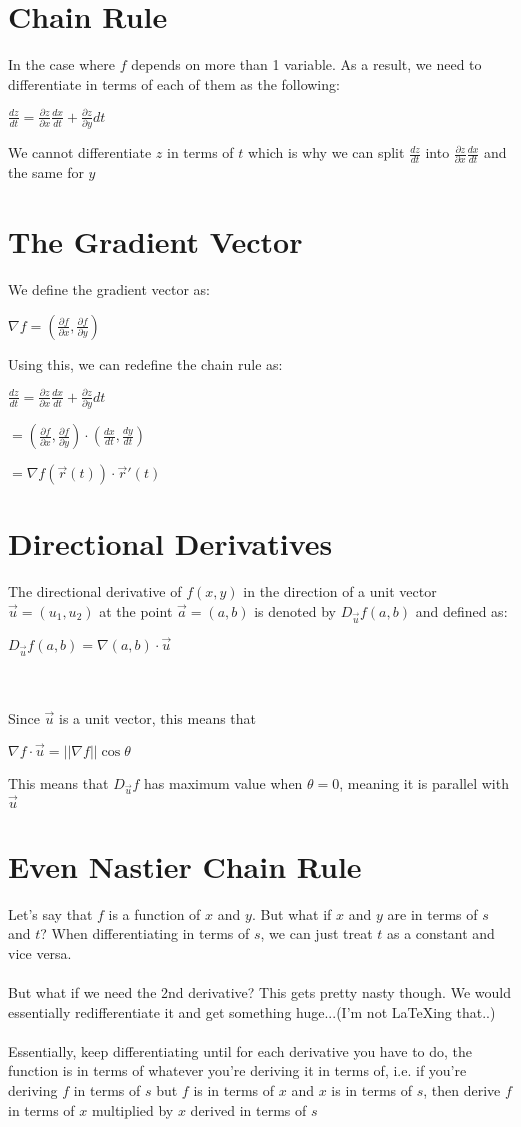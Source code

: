\documentclass[12pt]{report}
\begin{document}
	\section{Chain Rule}
		In the case where $f$ depends on more than 1 variable. As a result, we need to differentiate in terms of each of them as the following:\\
		\centerline{$\frac{dz}{dt} = \frac{\partial z}{\partial x}\frac{dx}{dt} + \frac{\partial z}{\partial y}{dt}$}
		We cannot differentiate $z$ in terms of $t$ which is why we can split $\frac{dz}{dt}$ into $\frac{\partial z}{\partial x}\frac{dx}{dt}$ and the same for $y$
	\section{The Gradient Vector}
		We define the gradient vector as:\\
		\centerline{$\nabla f = (\frac{\partial f}{\partial x}, \frac{\partial f}{\partial y})$}
		Using this, we can redefine the chain rule as:\\
		\centerline{$\frac{dz}{dt} = \frac{\partial z}{\partial x}\frac{dx}{dt} + \frac{\partial z}{\partial y}{dt}$}
		\centerline{$= (\frac{\partial f}{\partial x}, \frac{\partial f}{\partial y}) \cdot (\frac{dx}{dt}, \frac{dy}{dt})$}
		\centerline{$= \nabla f(\vec{r}(t))\cdot \vec{r}'(t)$}
	\section{Directional Derivatives}
		The directional derivative of $f(x,y)$ in the direction of a unit vector $\vec{u} = (u_1,u_2)$ at the point $\vec{a} = (a,b)$ is denoted by $D_{\vec{u}} f(a,b)$ and defined as:\\
		\centerline{$D_{\vec{u}} f(a,b) = \nabla (a,b) \cdot \vec{u}$}
		\\
		\\
		Since $\vec{u}$ is a unit vector, this means that \\
		\centerline{$\nabla f \cdot \vec{u} = ||\nabla f || \cos \theta$}
		This means that $D_{\vec{u}}f$ has maximum value when $\theta = 0$, meaning it is parallel with $\vec{u}$
	\section{Even Nastier Chain Rule}
		Let's say that $f$ is a function of $x$ and $y$. But what if $x$ and $y$ are in terms of $s$ and $t$? When differentiating in terms of $s$, we can just treat $t$ as a constant and vice versa.\\
		\\
		But what if we need the 2nd derivative? This gets pretty nasty though. We would essentially redifferentiate it and get something huge...(I'm not LaTeXing that..)\\
		\\
		Essentially, keep differentiating until for each derivative you have to do, the function is in terms of whatever you're deriving it in terms of, i.e. if you're deriving $f$ in terms of $s$ but $f$ is in terms of $x$ and $x$ is in terms of $s$, then derive $f$ in terms of $x$ multiplied by $x$ derived in terms of $s$
\end{document}

